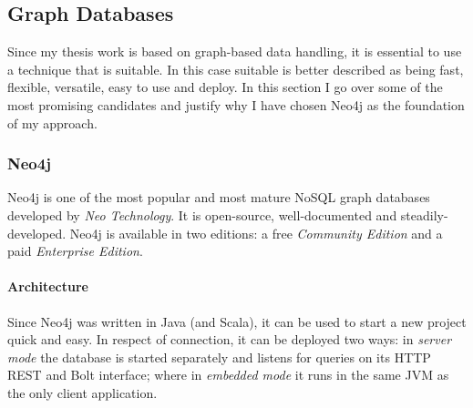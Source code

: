 

\subsection{Graph Databases}
Since my thesis work is based on graph-based data handling, it is essential to use a technique that is suitable. In this case suitable is better described as being fast, flexible, versatile, easy to use and deploy. In this section I go over some of the most promising candidates and justify why I have chosen Neo4j as the foundation of my approach.

\subsubsection{Neo4j}
Neo4j is one of the most popular and most mature NoSQL graph databases developed by \emph{Neo Technology}. It is open-source, well-documented and steadily-developed. Neo4j is available in two editions: a free \emph{Community Edition} and a paid \emph{Enterprise Edition}.~\cite{neo4j}

\paragraph{Architecture}
Since Neo4j was written in Java (and Scala), it can be used to start a new project quick and easy. In respect of connection, it can be deployed two ways: in \emph{server mode} the database is started separately and listens for queries on its HTTP REST and Bolt interface; where in \emph{embedded mode} it runs in the same JVM as the only client application.

